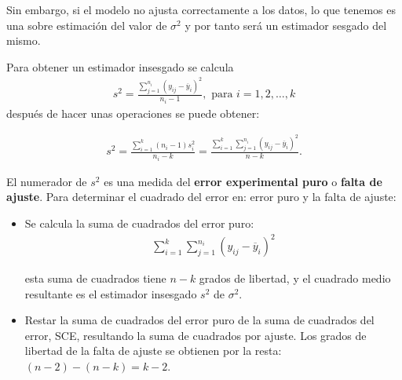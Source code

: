 \begin{itemize}
\begin{enumerate}
Sin embargo, si el modelo no ajusta correctamente a los datos, lo que tenemos es una sobre estimaci\'on del valor de $\sigma^{2}$ y por tanto ser\'a un estimador sesgado del mismo.\medskip

Para obtener un estimador insesgado se calcula
\begin{eqnarray*}
s^{2}=\frac{\sum_{j=1}^{n_{i}}\left(y_{ij}-\overline{y}_{i}\right)^{2}}{n_{i}-1},\textrm{ para } i=1,2,\ldots,k
\end{eqnarray*}
despu\'es de hacer unas operaciones se puede obtener:

\begin{eqnarray*}
s^{2}=\frac{\sum_{i=1}^{k}\left(n_{i}-1\right)s_{i}^{2}}{n_{i}-k}=\frac{\sum_{i=1}^{k}\sum_{j=1}^{n_{i}}\left(y_{ij}-\overline{y}_{i}\right)^{2}}{n-k}.
\end{eqnarray*}

El numerador de $s^{2}$ es una medida del \textbf{error experimental puro} o \textbf{falta de ajuste}. Para determinar el cuadrado del error en: error puro y la falta de ajuste:
\begin{itemize}
\item Se calcula la suma de cuadrados del error puro:
\begin{eqnarray*}
\sum_{i=1}^{k}\sum_{j=1}^{n_{i}}\left(y_{ij}-\overline{y}_{i}\right)^{2}
\end{eqnarray*}

esta suma de cuadrados tiene $n-k$ grados de libertad, y el cuadrado medio resultante es el estimador insesgado $s^{2}$ de $\sigma^{2}$.

\item Restar la suma de cuadrados del error puro de la suma de cuadrados del error, SCE, resultando la suma de cuadrados por ajuste. Los grados de libertad de la  falta de ajuste se obtienen por la resta: $\left(n-2\right)-\left(n-k\right)=k-2$.
\end{itemize}


\end{enumerate}
\end{itemize}

